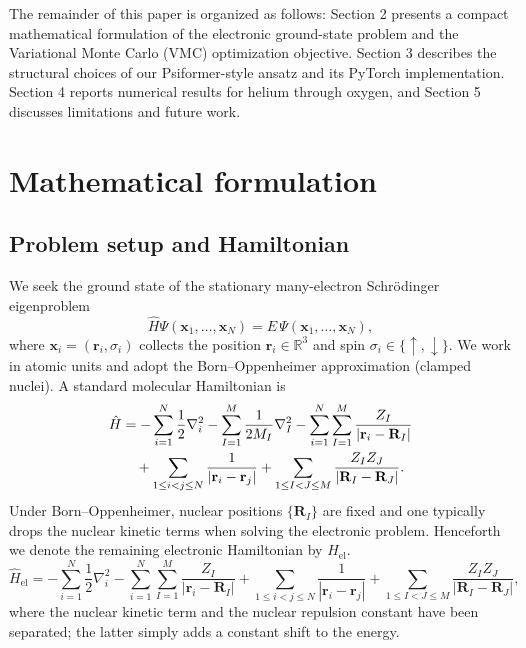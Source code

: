 The remainder of this paper is organized as
follows: Section 2 presents a compact mathematical formulation of the electronic
ground-state problem and the Variational Monte Carlo (VMC) optimization objective.
Section 3 describes the structural choices of our Psiformer-style ansatz and its
PyTorch implementation. Section 4 reports numerical results for helium through oxygen,
and Section 5 discusses limitations and future work.

\section{Mathematical formulation}

\subsection{Problem setup and Hamiltonian}
We seek the ground state of the stationary many-electron Schr\"odinger eigenproblem
\begin{equation}
	\hat{H}\Psi(\mathbf{x}_{1},\dots,\mathbf{x}_{N})=E\,\Psi(\mathbf{x}_{1},\dots,\mathbf{x}_{N}),
\end{equation}
where $\mathbf{x}_i=(\mathbf{r}_i,\sigma_i)$ collects the position $\mathbf{r}_i\in\mathbb{R}^3$ and spin $\sigma_i\in\{\uparrow,\downarrow\}$. We work in atomic units and adopt the Born--Oppenheimer approximation (clamped nuclei). A standard molecular Hamiltonian is
\begin{align}
	\hat H & =
	-\sum_{i=1}^{N}\frac{1}{2}\nabla_i^{2}
	-\sum_{I=1}^{M}\frac{1}{2M_I}\nabla_{I}^{2}
	-\sum_{i=1}^{N}\sum_{I=1}^{M}\frac{Z_I}{|\mathbf r_i-\mathbf R_I|} \notag\\
	&\quad +\sum_{1\le i<j\le N}\frac{1}{|\mathbf r_i-\mathbf r_j|}
	+\sum_{1\le I<J\le M}\frac{Z_I Z_J}{|\mathbf R_I-\mathbf R_J|}.
\end{align}
Under Born--Oppenheimer, nuclear positions $\{\mathbf{R}_I\}$ are fixed and one typically drops the nuclear kinetic terms when solving the electronic problem.  Henceforth we denote the remaining electronic Hamiltonian by $\hat{H}_{\text{el}}$.
\begin{equation}
	\hat{H}_{\text{el}} =
	-\sum_{i=1}^{N}\frac{1}{2}\nabla_i^{2}
	-\sum_{i=1}^{N}\sum_{I=1}^{M}\frac{Z_I}{|\mathbf r_i-\mathbf R_I|}
	+\sum_{1\le i<j\le N}\frac{1}{|\mathbf r_i-\mathbf r_j|}
	+\sum_{1\le I<J\le M}\frac{Z_I Z_J}{|\mathbf R_I-\mathbf R_J|},
	\label{eq:el_hamiltonian}
\end{equation}
where the nuclear kinetic term and the nuclear repulsion constant have been separated; the latter simply adds a constant shift to the energy.

